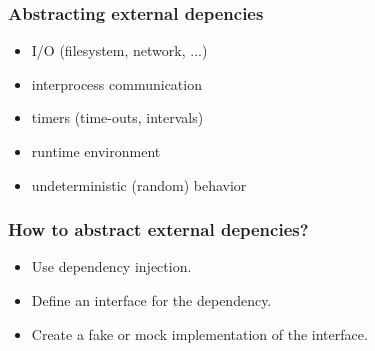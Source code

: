 \begin{frame}
	\frametitle{Abstracting external depencies}

	\begin{itemize}[<+-| highlight@+>]
		\item I/O (filesystem, network, ...)
		\item interprocess communication
		\item timers (time-outs, intervals)
		\item runtime environment
		\item undeterministic (random) behavior
	\end{itemize}
\end{frame}


\begin{frame}
	\frametitle{How to abstract external depencies?}

	\begin{itemize}[<+-| highlight@+>]
		\item Use dependency injection.
		\item Define an interface for the dependency.
		\item Create a fake or mock implementation of the interface.
	\end{itemize}
\end{frame}

